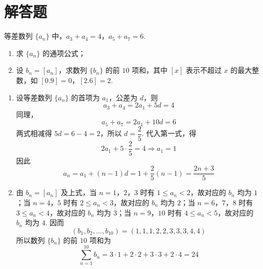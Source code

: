 \section{解答题}

\begin{problem}
等差数列 \(\{a_n\}\) 中，\(a_3+a_4=4\)，\(a_5+a_7=6\).

\begin{enumerate}
\item 求 \(\{a_n\}\) 的通项公式；
\item 设 \(b_n=[a_n]\)，求数列 \(\{b_n\}\) 的前 \(10\) 项和，其中 \([x]\) 表示不超过 \(x\) 的最大整数，如 \([0.9]=0\)，\([2.6]=2\).
\end{enumerate}
\end{problem}

\begin{solution}
\begin{enumerate}
\item 设等差数列 \(\{a_n\}\) 的首项为 \(a_1\)，公差为 \(d\)，则
\[
a_3+a_4=2a_1+5d=4
\]
同理，
\[
a_5+a_7=2a_1+10d=6
\]
两式相减得 \(5d=6-4=2\)，所以 \(d=\dfrac25\). 代入第一式，得
\[
2a_1+5\cdot\dfrac25=4\Longrightarrow a_1=1
\]
因此
\[
a_n=a_1+(n-1)d=1+\dfrac25(n-1)=\dfrac{2n+3}{5}
\]

\item 由 \(b_n=[a_n]\) 及上式，当 \(n=1\)，\(2\)，\(3\) 时有 \(1\leq a_n<2\)，故对应的 \(b_n\) 均为 \(1\)；当 \(n=4\)，\(5\) 时有 \(2\leq a_n<3\)，故对应的 \(b_n\) 均为 \(2\)；当 \(n=6\)，\(7\)，\(8\) 时有 \(3\leq a_n<4\)，故对应的 \(b_n\) 均为 \(3\)；当 \(n=9\)，\(10\) 时有 \(4\leq a_n<5\)，故对应的 \(b_n\) 均为 \(4\). 因而
\[
(b_1,b_2,\ldots,b_{10})=(1,1,1,2,2,3,3,3,4,4)
\]
所以数列 \(\{b_n\}\) 的前 \(10\) 项和为
\[
\sum_{n=1}^{10}b_n=3\cdot1+2\cdot2+3\cdot3+2\cdot4=24
\]
\end{enumerate}
\end{solution}


